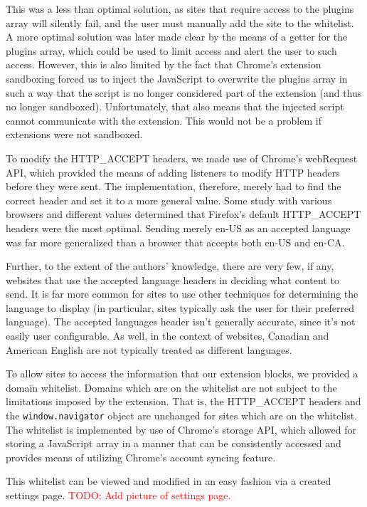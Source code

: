 \documentclass[12pt,a4paper]{article}
\begin{document}
This was a less than optimal solution, as sites that require access to the plugins array will silently fail, and the user must manually add the site to the whitelist. A more optimal solution was later made clear by the means of a getter for the plugins array, which could be used to limit access and alert the user to such access. However, this is also limited by the fact that Chrome's extension sandboxing forced us to inject the JavaScript to overwrite the plugins array in such a way that the script is no longer considered part of the extension (and thus no longer sandboxed). Unfortunately, that also means that the injected script cannot communicate with the extension. This would not be a problem if extensions were not sandboxed.

To modify the HTTP\_ACCEPT headers, we made use of Chrome's webRequest API\cite{webrequest}, which provided the means of adding listeners to modify HTTP headers before they were sent. The implementation, therefore, merely had to find the correct header and set it to a more general value. Some study with various browsers and different values determined that Firefox's default HTTP\_ACCEPT headers were the most optimal. Sending merely en-US as an accepted language was far more generalized than a browser that accepts both en-US and en-CA.

Further, to the extent of the authors' knowledge, there are very few, if any, websites that use the accepted language headers in deciding what content to send. It is far more common for sites to use other techniques for determining the language to display (in particular, sites typically ask the user for their preferred language). The accepted languages header isn't generally accurate, since it's not easily user configurable. As well, in the context of websites, Canadian and American English are not typically treated as different languages.

To allow sites to access the information that our extension blocks, we provided a domain whitelist. Domains which are on the whitelist are not subject to the limitations imposed by the extension. That is, the HTTP\_ACCEPT headers and the \texttt{window.navigator} object are unchanged for sites which are on the whitelist. The whitelist is implemented by use of Chrome's storage API\cite{storage}, which allowed for storing a JavaScript array in a manner that can be consistently accessed and provides means of utilizing Chrome's account syncing feature.

This whitelist can be viewed and modified in an easy fashion via a created settings page. \textcolor{red}{TODO: Add picture of settings page.}
\end{document}
